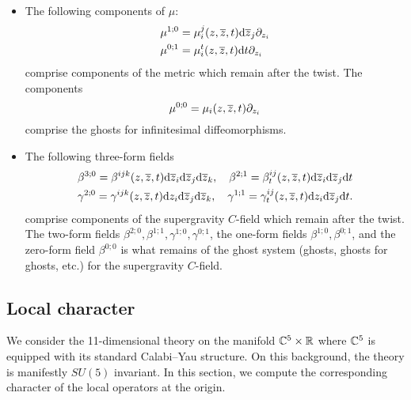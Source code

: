 \begin{itemize}
\item 
The following components of $\mu$:
\begin{align*}
\mu^{1;0} & = \mu^j_i(z,\overline{z},t) {\rm d} \overline{z}_j \partial_{z_i} \\
\mu^{0;1} & = \mu^t_i (z,\overline{z},t) {\rm d} t \partial_{z_i}
\end{align*}
comprise components of the metric which remain after the twist. 
The components 
\[
\mu^{0;0} = \mu_i (z,\overline{z},t) \partial_{z_i} 
\]
comprise the ghosts for infinitesimal diffeomorphisms. 
\item 
The following three-form fields
\begin{multline}
\beta^{3;0} = \beta^{ijk} (z,\overline{z},t) {\rm d} \overline{z}_i {\rm d} \overline{z}_j {\rm d} \overline{z}_k , \quad \beta^{2;1} = \beta^{ij}_t (z,\overline{z},t) {\rm d} \overline{z}_i {\rm d} \overline{z}_j {\rm d} t \\
\gamma^{2;0} = \gamma^{ijk} (z,\overline{z},t) {\rm d} z_i {\rm d} \overline{z}_j {\rm d} \overline{z}_k , \quad \gamma^{1;1} = \gamma^{ij}_t (z,\overline{z},t) {\rm d} z_i {\rm d} \overline{z}_j {\rm d} t .
\end{multline} 
comprise components of the supergravity $C$-field which remain after the twist. 
The two-form fields $\beta^{2;0}, \beta^{1;1}, \gamma^{1;0}, \gamma^{0;1}$, the one-form fields $\beta^{1;0}, \beta^{0;1}$, and the zero-form field $\beta^{0;0}$ is what remains of the ghost system (ghosts, ghosts for ghosts, etc.) for the supergravity $C$-field. 
\end{itemize}

\subsection{Local character}\label{sec:locchar}

We consider the 11-dimensional theory on the manifold $\mathbb C^5 \times \mathbb R$ where $\mathbb C^5$ is equipped with its standard Calabi--Yau structure. 
On this background, the theory is manifestly $SU(5)$ invariant. 
In this section, we compute the corresponding character of the local operators at the origin. 

